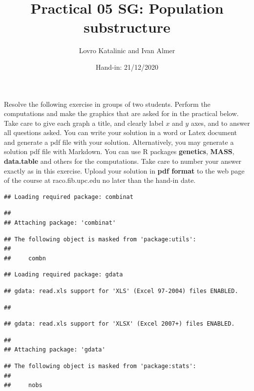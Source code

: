 \documentclass[
]{article}
\title{Practical 05 SG: Population substructure}
\author{Lovro Katalinic and Ivan Almer}
\date{Hand-in: 21/12/2020}
\begin{document}
\maketitle

Resolve the following exercise in groups of two students. Perform the
computations and make the graphics that are asked for in the practical
below. Take care to give each graph a title, and clearly label \(x\) and
\(y\) axes, and to answer all questions asked. You can write your
solution in a word or Latex document and generate a pdf file with your
solution. Alternatively, you may generate a solution pdf file with
Markdown. You can use R packages \textbf{genetics}, \textbf{MASS},
\textbf{data.table} and others for the computations. Take care to number
your answer exactly as in this exercise. Upload your solution in
\textbf{pdf format} to the web page of the course at raco.fib.upc.edu no
later than the hand-in date.

\begin{verbatim}
## Loading required package: combinat
\end{verbatim}

\begin{verbatim}
## 
## Attaching package: 'combinat'
\end{verbatim}

\begin{verbatim}
## The following object is masked from 'package:utils':
## 
##     combn
\end{verbatim}

\begin{verbatim}
## Loading required package: gdata
\end{verbatim}

\begin{verbatim}
## gdata: read.xls support for 'XLS' (Excel 97-2004) files ENABLED.
\end{verbatim}

\begin{verbatim}
## 
\end{verbatim}

\begin{verbatim}
## gdata: read.xls support for 'XLSX' (Excel 2007+) files ENABLED.
\end{verbatim}

\begin{verbatim}
## 
## Attaching package: 'gdata'
\end{verbatim}

\begin{verbatim}
## The following object is masked from 'package:stats':
## 
##     nobs
\end{verbatim}
\end{document}
